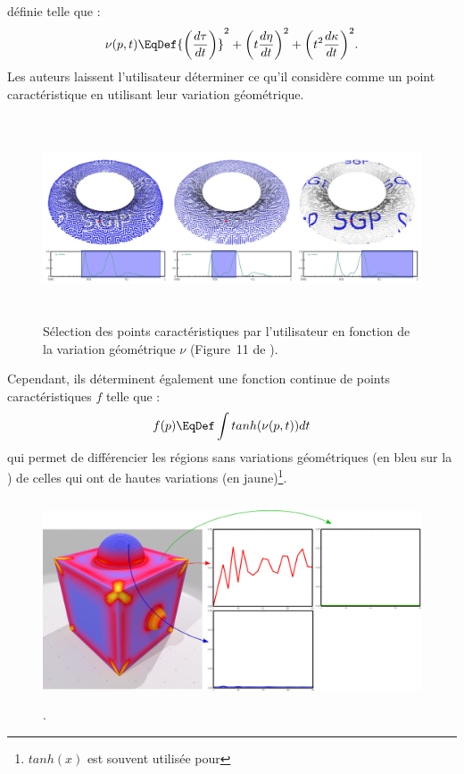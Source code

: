 définie telle que :
%
\begin{equation}
  \nu(p,t) \EqDef
  {\left(
    \frac{d\tau}{dt} \right)}^2
    + {\left( t\frac{d\eta}{dt}
  \right)}^2
  + {\left( t^2\frac{d\kappa}{dt} \right)}^2.
\end{equation}
%
Les auteurs laissent l'utilisateur déterminer ce qu'il considère comme un point
caractéristique en utilisant leur variation géométrique.
%
\begin{figure}[ht]{
    \begin{center}
    \includegraphics[height=6cm]{images/Feature/Mellado_multiscale}
    \end{center}}
    \caption[Sélection des points caractéristiques par l'utilisateur.]{Sélection des points caractéristiques par l'utilisateur en fonction de la variation géométrique $\nu$ (Figure~11 de \cite{Mellado2012}).
      \label{fig:mellado-multiscale}}
\end{figure}
%
Cependant, ils déterminent également une fonction continue de points
caractéristiques $f$ telle que :
%
\begin{equation}
   f(p) \EqDef \int tanh(\nu(p,t)) dt
\end{equation}
%
qui permet de différencier les régions sans variations géométriques (en bleu sur
la ) de celles qui ont de hautes variations
(en jaune)\footnote{$tanh(x)$ est souvent utilisée pour }.
%
\begin{figure}[ht]{
  \begin{center}
    \includegraphics[height=6cm]{figures/CubeSpherePlotMellado}
  \end{center}}
    \caption[.]{.
    \label{fig:mellado-cubesphere}}
\end{figure}
